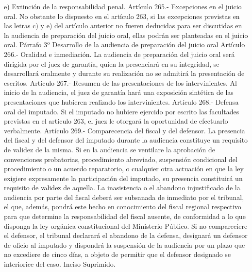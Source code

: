     e) Extinción de la responsabilidad penal.
    Artículo 265.- Excepciones en el juicio oral. No obstante lo dispuesto en el artículo 263, si las excepciones previstas en las letras c) y e) del artículo anterior no fueren deducidas para ser discutidas en la audiencia de preparación del juicio oral, ellas podrán ser planteadas en el juicio oral.
    Párrafo 3º Desarrollo de la audiencia de
preparación del juicio oral
    Artículo 266.- Oralidad e inmediación. La audiencia de preparación del juicio oral será dirigida por el juez de garantía, quien la presenciará en su integridad, se desarrollará oralmente y durante su realización no se admitirá la presentación de escritos.
    Artículo 267.- Resumen de las presentaciones de los intervinientes. Al inicio de la audiencia, el juez de garantía hará una exposición sintética de las presentaciones que hubieren realizado los intervinientes.
    Artículo 268.- Defensa oral del imputado. Si el imputado no hubiere ejercido por escrito las facultades previstas en el artículo 263, el juez le otorgará la oportunidad de efectuarlo verbalmente.
    Artículo 269.- Comparecencia del fiscal y del defensor. La presencia del fiscal y del defensor del imputado durante la audiencia constituye un requisito de validez de la misma.
    Si en la audiencia se ventilare la aprobación de convenciones probatorias, procedimiento abreviado, suspensión condicional del procedimiento o un acuerdo reparatorio, o cualquier otra actuación en que la ley exigiere expresamente la participación del imputado, su presencia constituirá un requisito de validez de aquella.
    La inasistencia o el abandono injustificado de la audiencia por parte del fiscal deberá ser subsanada de inmediato por el tribunal, el que, además, pondrá este hecho en conocimiento del fiscal regional respectivo para que determine la responsabilidad del fiscal ausente, de conformidad a lo que disponga la ley orgánica constitucional del Ministerio Público. Si no compareciere el defensor, el tribunal declarará el abandono de la defensa, designará un defensor de oficio al imputado y dispondrá la suspensión de la audiencia por un plazo que no excediere de cinco días, a objeto de permitir que el defensor designado se interiorice del caso.
    Inciso Suprimido.




